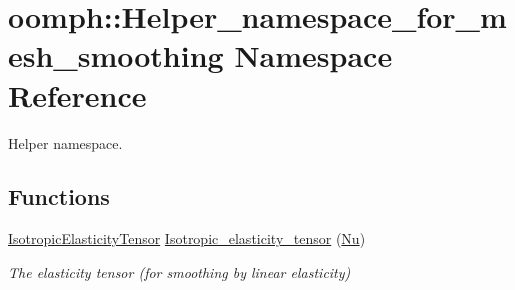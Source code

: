 \hypertarget{namespaceoomph_1_1Helper__namespace__for__mesh__smoothing}{}\section{oomph\+:\+:Helper\+\_\+namespace\+\_\+for\+\_\+mesh\+\_\+smoothing Namespace Reference}
\label{namespaceoomph_1_1Helper__namespace__for__mesh__smoothing}


Helper namespace.  


\subsection*{Functions}
\begin{DoxyCompactItemize}
\item 
\hyperlink{classoomph_1_1IsotropicElasticityTensor}{Isotropic\+Elasticity\+Tensor} \hyperlink{namespaceoomph_1_1Helper__namespace__for__mesh__smoothing_abfbf54a4e1228fd633c57ada920d28cc}{Isotropic\+\_\+elasticity\+\_\+tensor} (\hyperlink{namespaceoomph_1_1Helper__namespace__for__mesh__smoothing_a27eabf4a5c7ca88b62dcb3e87462587e}{Nu})
\begin{DoxyCompactList}\small\item\em The elasticity tensor (for smoothing by linear elasticity) \end{DoxyCompactList}\end{DoxyCompactItemize}
